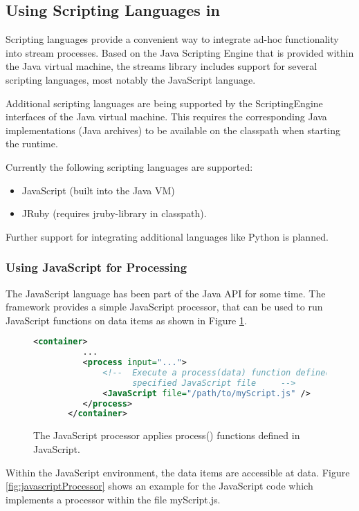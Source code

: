 \subsection{\label{sec:scripting}Using Scripting Languages in \streams}
Scripting languages provide a convenient way to integrate ad-hoc
functionality into stream processes. Based on the Java Scripting
Engine that is provided within the Java virtual machine, the streams
library includes support for several scripting languages, most notably
the JavaScript language.

Additional scripting languages are being supported by the
ScriptingEngine interfaces of the Java virtual machine. This requires
the corresponding Java implementations (Java archives) to be available
on the classpath when starting the \streams runtime.

Currently the following scripting languages are supported:
\begin{itemize}
   \item JavaScript (built into the Java VM)
   \item JRuby (requires jruby-library in classpath).
\end{itemize}
Further support for integrating additional languages like Python is
planned.\baustelle


\subsubsection{\label{sec:javascript}Using JavaScript for Processing}
The JavaScript language has been part of the Java API for some
time. The \streams framework provides a simple {\ttfamily JavaScript}
processor, that can be used to run JavaScript functions on data items
as shown in Figure \ref{fig:javascriptExample}.

\begin{figure}[h!]
  \centering
  \begin{lstlisting}[language=XML]
       <container>
          ...
          <process input="...">
              <!--  Execute a process(data) function defined in the
                    specified JavaScript file     -->
              <JavaScript file="/path/to/myScript.js" />
          </process>
       </container>
  \end{lstlisting}
  \caption{\label{fig:javascriptExample}The {\ttfamily JavaScript} processor applies process() functions defined in JavaScript.}
\end{figure}


Within the JavaScript environment, the data items are accessible at
{\ttfamily data}. Figure \ref{fig:javascriptProcessor} shows an
example for the JavaScript code which implements a processor within
the file {\ttfamily myScript.js}.

